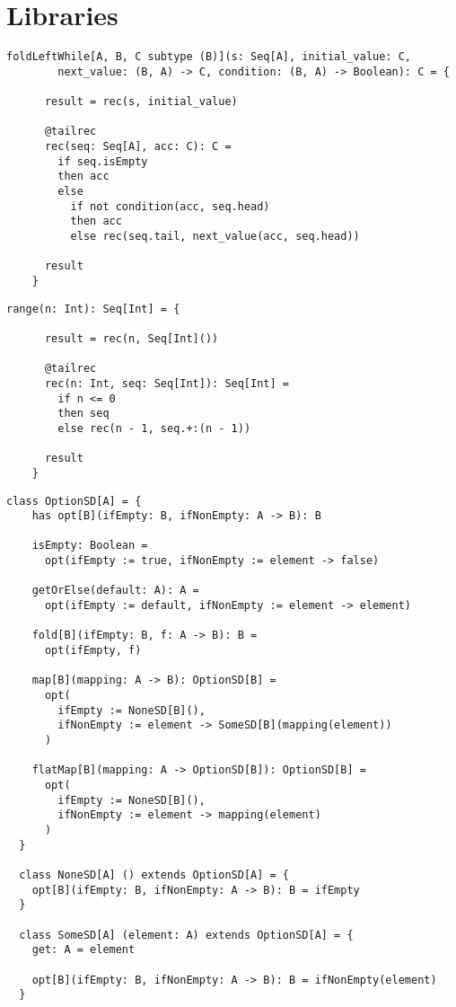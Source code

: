 \chapter{Libraries}

\begin{lstlisting}[label={lst:foldLeftWhile}]
    foldLeftWhile[A, B, C subtype (B)](s: Seq[A], initial_value: C,
        next_value: (B, A) -> C, condition: (B, A) -> Boolean): C = {

      result = rec(s, initial_value)

      @tailrec
      rec(seq: Seq[A], acc: C): C =
        if seq.isEmpty
        then acc
        else
          if not condition(acc, seq.head)
          then acc
          else rec(seq.tail, next_value(acc, seq.head))

      result
    }
\end{lstlisting}

\begin{lstlisting}[label={lst:range}]
    range(n: Int): Seq[Int] = {

      result = rec(n, Seq[Int]())

      @tailrec
      rec(n: Int, seq: Seq[Int]): Seq[Int] =
        if n <= 0
        then seq
        else rec(n - 1, seq.+:(n - 1))

      result
    }
\end{lstlisting}


\begin{lstlisting}[label={lst:option}]
  class OptionSD[A] = {
    has opt[B](ifEmpty: B, ifNonEmpty: A -> B): B

    isEmpty: Boolean =
      opt(ifEmpty := true, ifNonEmpty := element -> false)

    getOrElse(default: A): A =
      opt(ifEmpty := default, ifNonEmpty := element -> element)

    fold[B](ifEmpty: B, f: A -> B): B =
      opt(ifEmpty, f)

    map[B](mapping: A -> B): OptionSD[B] =
      opt(
        ifEmpty := NoneSD[B](),
        ifNonEmpty := element -> SomeSD[B](mapping(element))
      )

    flatMap[B](mapping: A -> OptionSD[B]): OptionSD[B] =
      opt(
        ifEmpty := NoneSD[B](),
        ifNonEmpty := element -> mapping(element)
      )
  }

  class NoneSD[A] () extends OptionSD[A] = {
    opt[B](ifEmpty: B, ifNonEmpty: A -> B): B = ifEmpty
  }

  class SomeSD[A] (element: A) extends OptionSD[A] = {
    get: A = element

    opt[B](ifEmpty: B, ifNonEmpty: A -> B): B = ifNonEmpty(element)
  }
\end{lstlisting}

